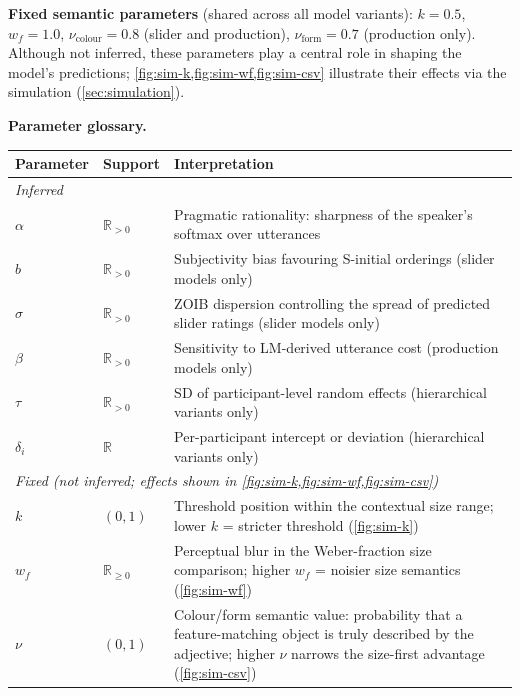\documentclass[11pt, a4paper]{article}
\begin{document}
\medskip\noindent\textbf{Fixed semantic parameters} (shared across all model variants):
$k = 0.5$, $w_f = 1.0$, $\nu_\text{colour} = 0.8$ (slider and production), $\nu_\text{form} = 0.7$ (production only).
Although not inferred, these parameters play a central role in shaping the model's predictions; \cref{fig:sim-k,fig:sim-wf,fig:sim-csv} illustrate their effects via the simulation (\cref{sec:simulation}).

\medskip\noindent\textbf{Parameter glossary.}

\begin{center}
\begin{tabularx}{\textwidth}{llX}
\toprule
\textbf{Parameter} & \textbf{Support} & \textbf{Interpretation} \\
\midrule
\multicolumn{3}{l}{\textit{Inferred}} \\
$\alpha$             & $\mathbb{R}_{>0}$    & Pragmatic rationality: sharpness of the speaker's softmax over utterances \\
$b$                  & $\mathbb{R}_{>0}$    & Subjectivity bias favouring S-initial orderings (slider models only) \\
$\sigma$             & $\mathbb{R}_{>0}$    & ZOIB dispersion controlling the spread of predicted slider ratings (slider models only) \\
$\beta$              & $\mathbb{R}_{>0}$    & Sensitivity to LM-derived utterance cost (production models only) \\
$\tau$               & $\mathbb{R}_{>0}$    & SD of participant-level random effects (hierarchical variants only) \\
$\delta_i$           & $\mathbb{R}$         & Per-participant intercept or deviation (hierarchical variants only) \\
\midrule
\multicolumn{3}{l}{\textit{Fixed (not inferred; effects shown in \cref{fig:sim-k,fig:sim-wf,fig:sim-csv})}} \\
$k$                  & $(0,1)$              & Threshold position within the contextual size range; lower $k$ = stricter threshold (\cref{fig:sim-k}) \\
$w_f$                & $\mathbb{R}_{\geq0}$ & Perceptual blur in the Weber-fraction size comparison; higher $w_f$ = noisier size semantics (\cref{fig:sim-wf}) \\
$\nu$                & $(0,1)$              & Colour/form semantic value: probability that a feature-matching object is truly described by the adjective; higher $\nu$ narrows the size-first advantage (\cref{fig:sim-csv}) \\
\bottomrule
\end{tabularx}
\end{center}
\end{document}
